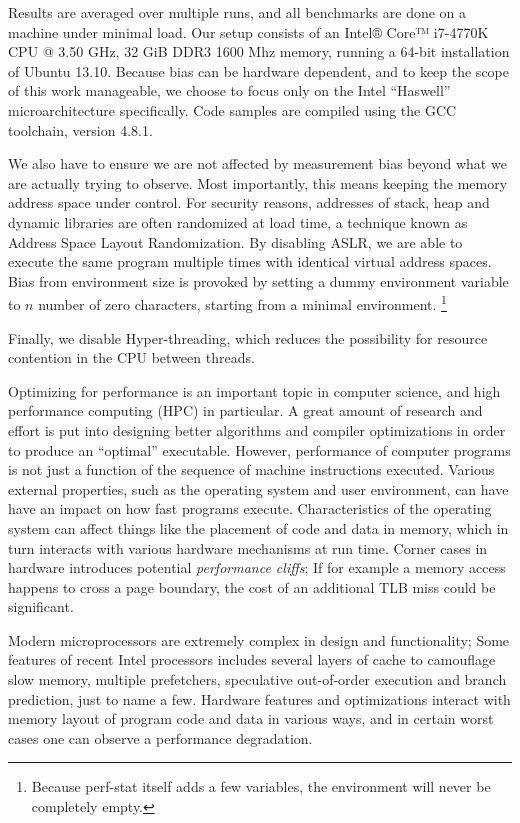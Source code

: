 \documentclass[a4paper,10pt,twocolumn,twoside]{article}
\begin{document}
Results are averaged over multiple runs, and all benchmarks are done on a machine under minimal load.
Our setup consists of an Intel® Core™ i7-4770K CPU @ 3.50 GHz, 32 GiB DDR3 1600 Mhz memory, running a 64-bit installation of Ubuntu 13.10.
Because bias can be hardware dependent, and to keep the scope of this work manageable, we choose to focus only on the Intel ``Haswell'' microarchitecture specifically.
Code samples are compiled using the GCC toolchain, version 4.8.1.

We also have to ensure we are not affected by measurement bias beyond what we are actually trying to observe.
Most importantly, this means keeping the memory address space under control.
For security reasons, addresses of stack, heap and dynamic libraries are often randomized at load time, a technique known as Address Space Layout Randomization.\cite{Shackham:2004:ASLR} %
By disabling ASLR, we are able to execute the same program multiple times with identical virtual address spaces.
Bias from environment size is provoked by setting a dummy environment variable to $n$ number of zero characters, starting from a minimal environment. \footnote{Because perf-stat itself adds a few variables, the environment will never be completely empty.}

Finally, we disable Hyper-threading, which reduces the possibility for resource contention in the CPU between threads.





\iffalse
Optimizing for performance is an important topic in computer science, and high performance computing (HPC) in particular. 
A great amount of research and effort is put into designing better algorithms and compiler optimizations in order to produce an ``optimal'' executable. 
However, performance of computer programs is not just a function of the sequence of machine instructions executed. 
Various external properties, such as the operating system and user environment, can have have an impact on how fast programs execute. 
Characteristics of the operating system can affect things like the placement of code and data in memory, which in turn interacts with various hardware mechanisms at run time.
Corner cases in hardware introduces potential \emph{performance cliffs}; If for example a memory access happens to cross a page boundary, the cost of an additional TLB miss could be significant. 

Modern microprocessors are extremely complex in design and functionality; Some features of recent Intel processors includes several layers of cache to camouflage slow memory, multiple prefetchers, speculative out-of-order execution and branch prediction, just to name a few.
Hardware features and optimizations interact with memory layout of program code and data in various ways, and in certain worst cases one can observe a performance degradation.
\end{document}
